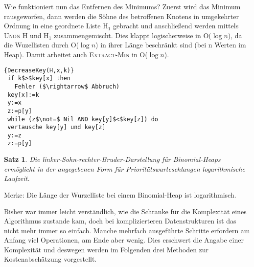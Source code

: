 \documentclass[ngerman,draft,parskip=half*,twoside]{scrreprt}
\theoremstyle{break}
\newtheorem{satz}{Satz}
\begin{document}
Wie funktioniert nun das Entfernen des Minimums? Zuerst wird das Minimum rausgeworfen, dann werden die Söhne des
betroffenen Knotens in umgekehrter Ordnung in eine geordnete Liste H$_1$ gebracht und anschließend werden mittels
\textsc{Unon} H und H$_1$ zusammengemischt. Dies klappt logischerweise in O($\log n$), da die Wuzellisten durch O($\log
n$) in ihrer Länge beschränkt sind (bei n Werten im Heap). Damit arbeitet auch \textsc{Extract-Min} in O($\log n$).

\begin{Algorithmus}[H]
\begin{lstlisting}[frame=tlrb, mathescape=true, title=\textsc{Decrease-Key\textnormal{(H, x, k)}},gobble=1]{DecreaseKey(H,x,k)}
 if k$>$key[x] then
   Fehler ($\rightarrow$ Abbruch)
 key[x]:=k
 y:=x
 z:=p[y]
 while (z$\not=$ Nil AND key[y]$<$key[z]) do
 vertausche key[y] und key[z]
 y:=z
 z:=p[y]    
\end{lstlisting}
\end{Algorithmus}

\begin{satz}
Die linker-Sohn-rechter-Bruder-Darstellung für Binomial-Heaps ermöglicht in der angegebenen Form für
Prioritätswarteschlangen logarithmische Laufzeit.
\end{satz}
Merke: Die Länge der Wurzelliste bei einem Binomial-Heap ist logarithmisch.

Bisher war immer leicht verständlich, wie die Schranke für die Komplexität eines Algorithmus zustande kam, doch bei
komplizierteren Datenstrukturen ist das nicht mehr immer so einfach. Manche mehrfach ausgeführte Schritte erfordern am
Anfang viel Operationen, am Ende aber wenig. Dies erschwert die Angabe einer Komplexität und deswegen werden im Folgenden drei Methoden zur
Kostenabschätzung vorgestellt.
\end{document}
